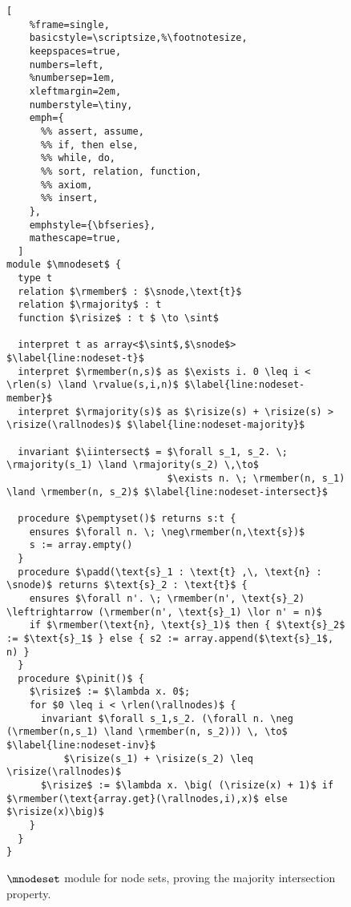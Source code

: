 \begin{figure}
\begin{lstlisting}[
    %frame=single,
    basicstyle=\scriptsize,%\footnotesize,
    keepspaces=true,
    numbers=left,
    %numbersep=1em,
    xleftmargin=2em,
    numberstyle=\tiny,
    emph={
      %% assert, assume,
      %% if, then else,
      %% while, do,
      %% sort, relation, function,
      %% axiom,
      %% insert,
    },
    emphstyle={\bfseries},
    mathescape=true,
  ]
module $\mnodeset$ {
  type t
  relation $\rmember$ : $\snode,\text{t}$
  relation $\rmajority$ : t
  function $\risize$ : t $ \to \sint$

  interpret t as array<$\sint$,$\snode$> $\label{line:nodeset-t}$
  interpret $\rmember(n,s)$ as $\exists i. 0 \leq i < \rlen(s) \land \rvalue(s,i,n)$ $\label{line:nodeset-member}$
  interpret $\rmajority(s)$ as $\risize(s) + \risize(s) > \risize(\rallnodes)$ $\label{line:nodeset-majority}$

  invariant $\iintersect$ = $\forall s_1, s_2. \; \rmajority(s_1) \land \rmajority(s_2) \,\to$
                            $\exists n. \; \rmember(n, s_1) \land \rmember(n, s_2)$ $\label{line:nodeset-intersect}$

  procedure $\pemptyset()$ returns s:t {
    ensures $\forall n. \; \neg\rmember(n,\text{s})$
    s := array.empty()
  }
  procedure $\padd(\text{s}_1 : \text{t} ,\, \text{n} : \snode)$ returns $\text{s}_2 : \text{t}$ {
    ensures $\forall n'. \; \rmember(n', \text{s}_2) \leftrightarrow (\rmember(n', \text{s}_1) \lor n' = n)$
    if $\rmember(\text{n}, \text{s}_1)$ then { $\text{s}_2$ := $\text{s}_1$ } else { s2 := array.append($\text{s}_1$, n) }
  }
  procedure $\pinit()$ {
    $\risize$ := $\lambda x. 0$;
    for $0 \leq i < \rlen(\rallnodes)$ {
      invariant $\forall s_1,s_2. (\forall n. \neg (\rmember(n,s_1) \land \rmember(n, s_2))) \, \to$ $\label{line:nodeset-inv}$
          $\risize(s_1) + \risize(s_2) \leq \risize(\rallnodes)$
      $\risize$ := $\lambda x. \big( (\risize(x) + 1)$ if $\rmember(\text{array.get}(\rallnodes,i),x)$ else $\risize(x)\big)$
    }
  }
}
\end{lstlisting}
\caption{\label{fig:nodeset}$\mnodeset$ module for node sets, proving the majority intersection property.}
\end{figure}

